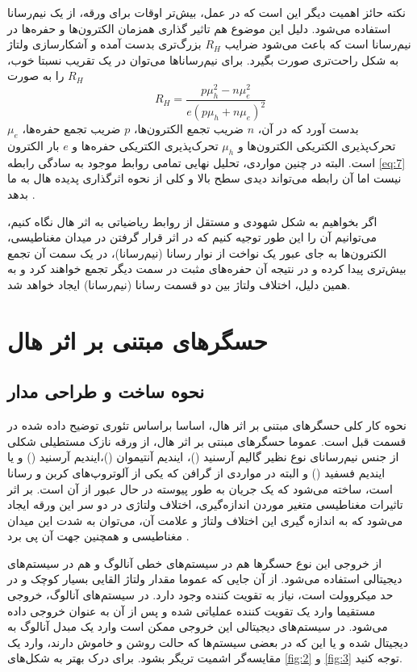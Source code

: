 نکته حائز اهمیت دیگر این است که  در عمل، بیش‌تر اوقات برای ورقه، از یک نیم‌رسانا استفاده می‌شود. دلیل این موضوع هم تاثیر گذاری همزمان الکترون‌ها و حفره‌ها در نیم‌رسانا است که باعث می‌شود ضرایب $R_H$ بزرگ‌تری بدست آمده و آشکارسازی ولتاژ به شکل راحت‌تری صورت بگیرد. برای نیم‌رسانا‌ها می‌توان در یک تقریب نسبتا خوب، $R_H$ را به صورت
\begin{equation}
	R_H = \frac{p \mu_h^2 - n \mu_e^2}{e(p\mu_h + n \mu_e)^2}
\end{equation}
بدست آورد که در آن، $n$ ضریب تجمع الکترون‌ها، $p$ ضریب تجمع حفره‌ها، $\mu_e$ تحرک‌پذیری الکتریکی الکترون‌ها و $\mu_h$ تحرک‌پذیری الکتریکی حفره‌ها و $e$ بار الکترون است. البته در چنین مواردی، تحلیل نهایی تمامی روابط موجود به سادگی رابطه \eqref{eq:7} نیست اما آن رابطه می‌تواند دیدی سطح بالا و کلی از نحوه اثرگذاری پدیده هال به ما بدهد
\cite{noauthor_hall_2021}.

اگر بخواهیم به شکل  شهودی و مستقل از روابط ریاضیاتی به اثر هال نگاه کنیم، می‌توانیم آن را این طور توجیه کنیم که در اثر قرار گرفتن در میدان مغناطیسی، الکترون‌ها به جای عبور یک نواخت از نوار رسانا (نیم‌رسانا)، در یک سمت آن تجمع بیش‌تری پیدا کرده و در نتیجه آن حفره‌های مثبت در سمت دیگر تجمع خواهند کرد و به همین دلیل، اختلاف ولتاژ بین دو قسمت رسانا (نیم‌رسانا) ایجاد خواهد شد.



\section{حسگر‌های مبتنی بر اثر هال}
\subsection{نحوه ساخت و طراحی مدار}

نحوه کار کلی حسگر‌های مبتنی بر اثر هال، اساسا براساس تئوری توضیح داده شده در قسمت قبل است. عموما حسگرهای مبنتی بر اثر هال، از ورقه نازک مستطیلی شکلی از جنس نیم‌رسانای نوع  نظیر گالیم آرسنید ()، ایندیم آنتیموان ()،ایندیم آرسنید () و یا ایندیم فسفید  () و البته در مواردی از گرافن که یکی از آلوتروپ‌های کربن و رسانا است، ساخته می‌شود که یک جریان به طور پیوسته در حال عبور از آن است. بر اثر تاثیرات مغناطیسی متغیر موردن اندازه‌گیری، اختلاف ولتاژی در دو سر این ورقه ایجاد می‌شود که به اندازه گیری این اختلاف ولتاژ و علامت آن، می‌توان به شدت این میدان مغناطیسی و همچنین جهت آن پی برد
\cite{wiki_sensor}.

از خروجی این نوع حسگر‌ها هم در سیستم‌های خطی آنالوگ و هم در سیستم‌های دیجیتالی استفاده می‌شود. از آن جایی که عموما مقدار ولتاژ القایی بسیار کوچک و در حد میکروولت است، نیاز به تقویت کننده وجود دارد. در سیستم‌های آنالوگ، خروجی مستقیما وارد یک تقویت کننده عملیاتی شده و پس از آن به عنوان خروجی داده می‌شود. در سیستم‌های دیجیتالی این خروجی ممکن است وارد یک مبدل آنالوگ به دیجیتال شده و یا این که در بعضی سیستم‌ها که حالت روشن و خاموش دارند، وارد یک مقایسه‌گر اشمیت تریگر
بشود. برای درک بهتر به شکل‌های
\ref{fig:2}
و
\ref{fig:3}
توجه کنید.

